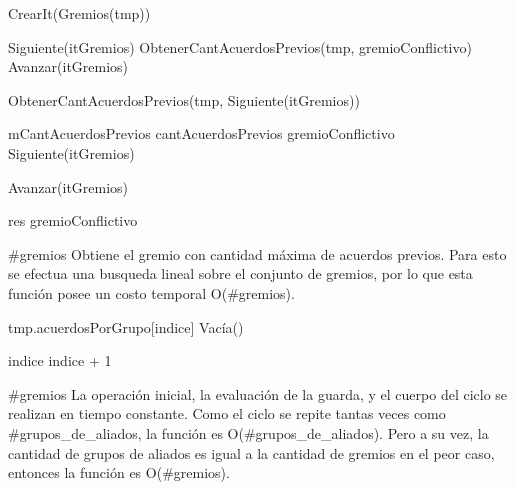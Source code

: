 {
	\state {} \asig CrearIt(Gremios(tmp))							
	\state

	\state {} \asig Siguiente(itGremios)							
	\state {} \asig ObtenerCantAcuerdosPrevios(tmp, gremioConflictivo)				
	\state Avanzar(itGremios)																	
	\state

																	
		\state

		\state {} \asig ObtenerCantAcuerdosPrevios(tmp, Siguiente(itGremios))		

									

			\state mCantAcuerdosPrevios \asig cantAcuerdosPrevios						
			\state gremioConflictivo \asig Siguiente(itGremios)			
		\endif

		\state
		\state Avanzar(itGremios)										
	\endwhile
	\state

	\state res \asig gremioConflictivo									
}
{\#gremios}
{Obtiene el gremio con cantidad m\'axima de acuerdos previos. Para esto se efectua una busqueda lineal sobre el conjunto de gremios, por lo que esta funci\'on posee un costo temporal O(\#gremios).}

{
	\state {} 									
				
		\state

		\state tmp.acuerdosPorGrupo[indice] \asig Vac\'ia()		

		\state
		\state indice \asig indice + 1									
	\endwhile

}
{\#gremios}
{ La operaci\'on inicial, la evaluaci\'on de la guarda, y el cuerpo del ciclo se realizan en tiempo constante. Como el ciclo se repite tantas veces como \#grupos\_de\_aliados, la funci\'on es O(\#grupos\_de\_aliados). Pero a su vez, la cantidad de grupos de aliados es igual a la cantidad de gremios en el peor caso, entonces la funci\'on es O(\#gremios). }


